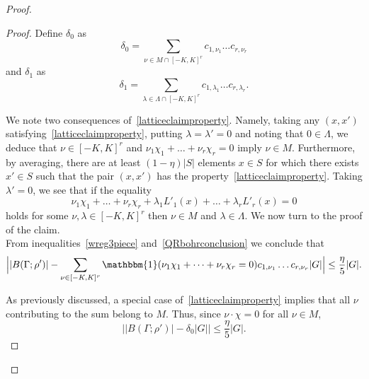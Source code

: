 \documentclass[a4paper,11pt]{article}
\numberwithin{theorem}{section}
\theoremstyle{definition}
\newcommand\id{\mathbbm{1}}
\begin{document}
\begin{proof}
\begin{proof}Define $\delta_0$ as
\[\delta_0 = \sum_{\nu \in M \cap [-K, K]^r} c_{1, \nu_1} \dots c_{r, \nu_r}\]
and $\delta_1$ as
\[\delta_1 = \sum_{\lambda \in \Lambda \cap [-K, K]^r} c_{1, \lambda_1} \dots c_{r, \lambda_r}.\]

We note two consequences of~\eqref{latticeclaimproperty}. Namely, taking any $(x,x')$ satisfying~\eqref{latticeclaimproperty}, putting $\lambda = \lambda' = 0$ and noting that $0 \in \Lambda$, we deduce that $\nu \in [-K, K]^r$ and $\nu_1 \chi_1 + \dots + \nu_r \chi_r = 0$ imply $\nu \in M$. Furthermore, by averaging, there are at least $(1 - \eta)|S|$ elements $x \in S$ for which there exists $x' \in S$ such that the pair $(x, x')$ has the property~\eqref{latticeclaimproperty}. Taking $\lambda' = 0$, we see that if the equality
\[\nu_1 \chi_1 + \dots + \nu_r \chi_r + \lambda_1 L'_1(x) + \dots + \lambda_r L'_r(x) = 0\]
holds for some $\nu, \lambda\in [-K, K]^r$ then $\nu \in M$ and $\lambda \in \Lambda$. We now turn to the proof of the claim.\\

From inequalities~\eqref{wreg3piece} and~\eqref{QRbohrconclusion} we conclude that
\[\Big||B(\Gamma; \rho')| - \sum_{\nu \in [-K, K]^r} \id(\nu_1 \chi_1 + \dots + \nu_r \chi_r = 0)c_{1, \nu_1} \dots c_{r, \nu_r} |G|\Big| \leq \frac{\eta}{5}|G|.\]

As previously discussed, a special case of~\eqref{latticeclaimproperty} implies that all $\nu$ contributing to the sum belong to $M$. Thus, since $\nu \cdot \chi = 0$ for all $\nu \in M$,
\[\Big||B(\Gamma; \rho')| - \delta_0 |G|\Big| \leq \frac{\eta}{5}|G|.\]


\end{proof}
\end{proof}
\end{document}
